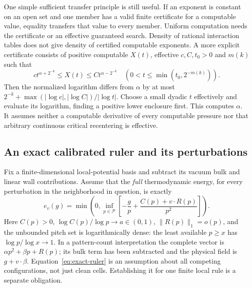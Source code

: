 One simple sufficient transfer principle is still useful. If an
exponent is constant on an open set and one member has a valid
finite certificate for a computable value, equality transfers that
value to every member. Uniform computation needs the certificate or
an effective guaranteed search. Density of rational interaction
tables does not give density of certified computable exponents.
A more explicit certificate consists of positive computable $X(t)$,
effective $c,C,t_0>0$ and $m(k)$ such that
\[
 ct^{\alpha+2^{-k}}\leq X(t)\leq Ct^{\alpha-2^{-k}}
 \quad(0<t\leq\min(t_0,2^{-m(k)})).
\]
Then the normalized logarithm differs from $\alpha$ by at most
$2^{-k}+\max(|\log c|,|\log C|)/|\log t|$. Choose a small dyadic
$t$ effectively and evaluate its logarithm, finding a positive lower
enclosure first. This computes $\alpha$. It assumes neither a
computable derivative of every computable pressure nor that arbitrary
continuous critical recentering is effective.

\subsection{An exact calibrated ruler and its perturbations}
\label{subsec:exact-ruler}
Fix a finite-dimensional local-potential basis and subtract its
vacuum bulk and linear wall contributions. Assume that the
\emph{full} thermodynamic energy, for every perturbation in the
neighborhood in question, is exactly
\begin{equation}\label{eq:exact-ruler}
 e_v(g)=\min\left(0,\inf_{p\in\mathcal P}
 \left[-\frac gp+\frac{C(p)+v\cdot R(p)}{p^2}\right]\right).
\end{equation}
Here $C(p)>0$, $\log C(p)/\log p\to a\in(0,1)$,
$\|R(p)\|_1=o(p)$, and the unbounded pitch set is logarithmically
dense: the least available $p\geq x$ has $\log p/\log x\to1$.
In a pattern-count interpretation the complete vector is
$\alpha p^2+\beta p+R(p)$; its bulk term has been subtracted and
the physical field is $g+v\cdot\beta$. Equation~\eqref{eq:exact-ruler}
is an assumption about all competing configurations, not just clean
cells. Establishing it for one finite local rule is a separate obligation.

